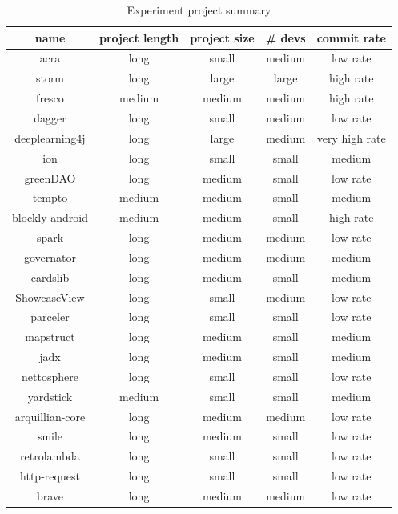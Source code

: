 \begin{table}
\begin{center}
    \begin{tabular}{|c|c|c|c|c|}
        \hline
        name & project length & project size & \# devs & commit rate \\
        \hline
        acra & long & small & medium & low rate \\
        storm & long & large & large & high rate \\
        fresco & medium & medium & medium & high rate \\
        dagger & long & small & medium & low rate \\
        deeplearning4j & long & large & medium & very high rate \\
        ion & long & small & small & medium \\
        greenDAO & long & medium & small & low rate \\
        tempto & medium & medium & small & medium \\
        blockly-android & medium & medium & small & high rate \\
        spark & long & medium & medium & low rate \\
        governator & long & medium & medium & medium \\
        cardslib & long & medium & small & medium \\
        ShowcaseView & long & small & medium & low rate \\
        parceler & long & small & small & low rate \\
        mapstruct & long & medium & small & medium \\
        jadx & long & medium & small & medium \\
        nettosphere & long & small & small & low rate \\
        yardstick & medium & small & small & medium \\
        arquillian-core & long & medium & medium & low rate \\
        smile & long & medium & small & low rate \\
        retrolambda & long & small & small & low rate \\
        http-request & long & small & small & low rate \\
        brave & long & medium & medium & low rate \\
        \hline
    \end{tabular}
\end{center}
\caption{Experiment project summary}
\label{tab:project_size_summary}
\end{table}

